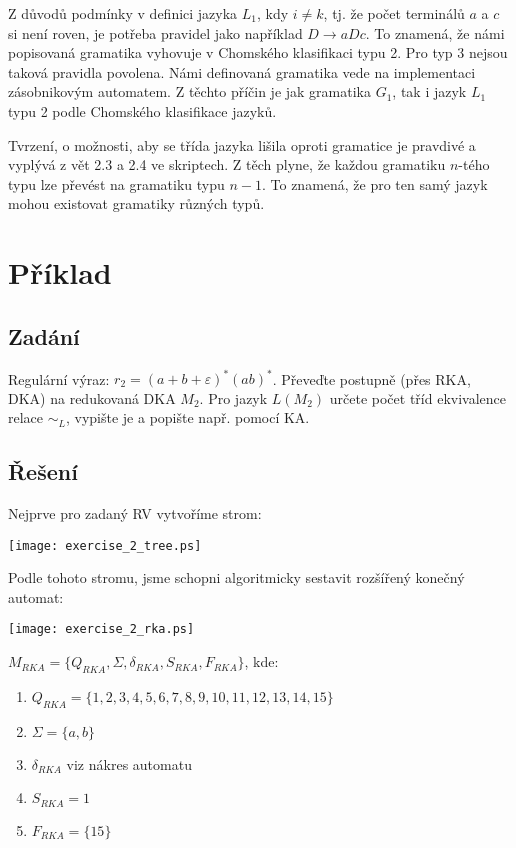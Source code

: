 \documentclass[11pt, a4paper]{article}
\begin{document}
Z důvodů podmínky v definici jazyka $L_1$, kdy $i \neq k$, tj. že počet terminálů $a$ a $c$ si není roven, je
potřeba pravidel jako například $ D \rightarrow aDc $. To znamená, že námi popisovaná gramatika vyhovuje v Chomského
klasifikaci typu 2. Pro typ 3 nejsou taková pravidla povolena. Námi definovaná gramatika vede na implementaci
zásobnikovým automatem. Z těchto příčin je jak gramatika $G_1$, tak i jazyk $L_1$ typu 2 podle Chomského klasifikace
jazyků.

Tvrzení, o možnosti, aby se třída jazyka lišila oproti gramatice je pravdivé a vyplývá z vět 2.3 a 2.4 ve skriptech.
Z těch plyne, že každou gramatiku $n$-tého typu lze převést na gramatiku typu $n - 1$. To znamená, že pro ten samý jazyk
mohou existovat gramatiky různých typů.

\section{Příklad}
\subsection*{Zadání}
Regulární výraz: $r_2 = (a + b + \varepsilon)^*(ab)^*$. Převeďte postupně (přes RKA, DKA) na redukovaná DKA $M_2$. Pro
jazyk $L(M_2)$ určete počet tříd ekvivalence relace $\sim_L$, vypište je a popište např. pomocí KA.
\subsection*{Řešení}
Nejprve pro zadaný RV vytvoříme strom:
\begin{center}
	\texttt{[image: exercise\_2\_tree.ps]}
\end{center}

\noindent Podle tohoto stromu, jsme schopni algoritmicky sestavit rozšířený konečný automat:
\begin{center}
	\texttt{[image: exercise\_2\_rka.ps]}
\end{center}


\noindent $ M_{RKA} = \{Q_{RKA}, \Sigma, \delta_{RKA}, S_{RKA}, F_{RKA}\}$, kde:
\begin{enumerate}
	\item $ Q_{RKA} = \{1, 2, 3, 4, 5, 6, 7, 8, 9, 10, 11, 12, 13, 14, 15\}$
	\item $ \Sigma = \{a, b\}$
	\item $ \delta_{RKA} $ viz nákres automatu
	\item $ S_{RKA} = 1$
	\item $ F_{RKA} = \{15\}$
\end{enumerate}
\end{document}
